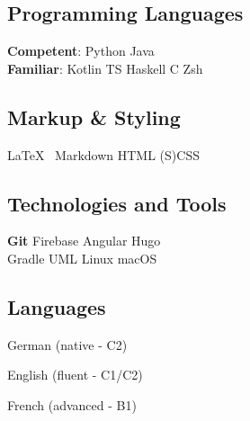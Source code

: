 \documentclass[]{jonas-cv}
\begin{document}
\lastupdated


%
%

\begin{minipage}[t]{0.33\textwidth} 


\tinysectionsep

\subsection{Programming Languages}
\textbf{Competent}: Python \textbullet{} Java\\
\textbf{Familiar}: Kotlin \textbullet{} TS \textbullet{} Haskell \textbullet{} C \textbullet{} Zsh
\sectionsep

\subsection{Markup \& Styling}
\LaTeX \ \textbullet{} Markdown \textbullet{} HTML \textbullet{} (S)CSS
\sectionsep

\subsection{Technologies and Tools}
\textbf{Git} \textbullet{} Firebase \textbullet{} Angular \textbullet{} Hugo \textbullet{}\\
Gradle \textbullet{} UML \textbullet{} Linux \textbullet{} macOS
\sectionsep

\subsection{Languages}
\tinysectionsep
\tinysectionsep
\begin{tightemize}
    \item German (native - C2)
    \item English (fluent - C1/C2)
    \item French (advanced - B1)
\end{tightemize}
\sectionsep 


\end{minipage}
\end{document}

